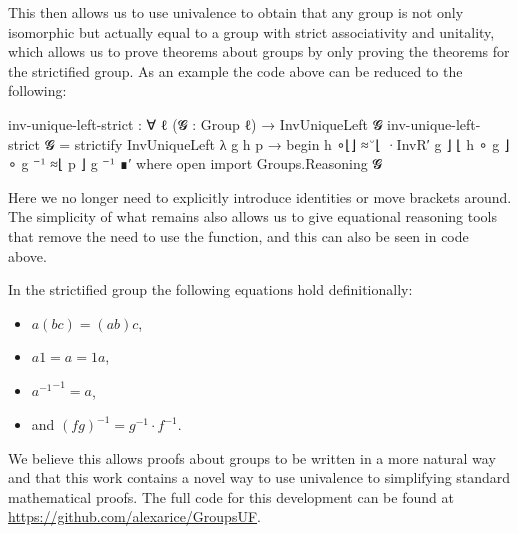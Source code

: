\documentclass{article}
\begin{document}
This then allows us to use univalence to obtain that any group is not only isomorphic but actually equal to a group with strict associativity and unitality, which allows us to prove theorems about groups by only proving the theorems for the strictified group. As an example the code above can be reduced to the following:
\begin{code}
inv-unique-left-strict : ∀ {ℓ} (𝓖 : Group ℓ) → InvUniqueLeft 𝓖
inv-unique-left-strict 𝓖 = strictify InvUniqueLeft
  λ g h p → begin
    h ∘⌊⌋            ≈˘⌊ ·InvR′ g ⌋
    ⌊ h ∘ g ⌋∘ g ⁻¹  ≈⌊  p      ⌋
    g ⁻¹ ∎′
  where
    open import Groups.Reasoning 𝓖
\end{code}
Here we no longer need to explicitly introduce identities or move brackets around. The simplicity of what remains also allows us to give equational reasoning tools that remove the need to use the  function, and this can also be seen in code above.

In the strictified group the following equations hold definitionally:
\begin{itemize}
\item \(a  (b c) = (a b) c\),
\item \(a 1 = a = 1 a\),
\item \({a^{-1}}^{-1} = a\),
\item and \((f g)^{-1} = g^{-1} \cdot f^{-1}\).
\end{itemize}
We believe this allows proofs about groups to be written in a more natural way and that this work contains a novel way to use univalence to simplifying standard mathematical proofs. The full code for this development can be found at \url{https://github.com/alexarice/GroupsUF}.
\end{document}
